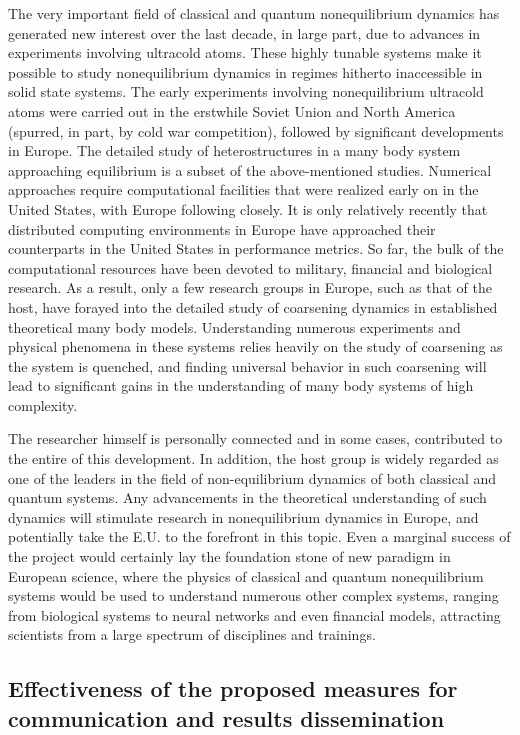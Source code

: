 \documentclass[a4paper,11pt]{article}
\begin{document}
The very important field of classical and quantum nonequilibrium dynamics has generated new interest over the last decade, in large part, due to advances in experiments involving ultracold atoms. These highly tunable systems make it possible to study nonequilibrium dynamics in regimes hitherto inaccessible in solid state systems. The early experiments involving nonequilibrium ultracold atoms were carried out in the erstwhile Soviet Union and North America (spurred, in part, by cold war competition), followed by significant developments in Europe. The detailed study of heterostructures in a many body system approaching equilibrium is a subset of the above-mentioned studies. Numerical approaches require computational facilities that were realized early on in the United States, with Europe following closely. It is only relatively recently that distributed computing environments in Europe have approached their counterparts in the United States in performance metrics. So far, the bulk of the computational 
resources have been devoted to military, financial and biological research. As a result, only a few research groups in Europe, such as that of the host, have forayed into the detailed study of coarsening dynamics in established theoretical many body models. Understanding numerous experiments and physical phenomena in these systems relies heavily on the study of coarsening as the system is quenched, and finding universal behavior in such coarsening will lead to significant gains in the understanding of many body systems of high complexity.

The researcher himself is personally connected and in some cases, contributed to the entire of this development. In addition, the host group is widely regarded as  one of the leaders in the field of non-equilibrium dynamics of both classical and quantum systems. Any advancements in the theoretical understanding of such dynamics will stimulate research in nonequilibrium dynamics in Europe, and potentially take the E.U. to the forefront in this topic. Even a marginal success of the project would certainly lay the foundation stone of new paradigm in European science, where the physics of classical and quantum nonequilibrium systems would be used to understand numerous other complex systems, ranging from biological systems to neural networks and even financial models, attracting scientists from a large spectrum of disciplines and trainings.

\subsection{Effectiveness of the proposed measures for communication and
  results dissemination}
\label{sec:impact-effectiveness}
\end{document}
